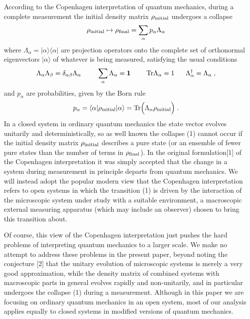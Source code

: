 \documentclass[12pt]{article}
\def\BM#1{\mbox{\boldmath{$#1$}}}
\begin{document}
According to the Copenhagen interpretation of quantum mechanics, during a complete measurement the initial density matrix $\rho_{\rm initial}$ undergoes a collapse 
\begin{equation}
\rho_{\rm initial}\mapsto \rho_{\rm final}=\sum_\alpha p_\alpha\Lambda_\alpha
\end{equation}
where $\Lambda_\alpha=|\alpha\rangle\langle\alpha|$ are projection operators onto the complete set of orthonormal eigenvectors $|\alpha\rangle$  of whatever is being measured, satisfying the usual conditions
\begin{equation}
\Lambda_\alpha\Lambda_\beta=\delta_{\alpha\beta}\Lambda_\alpha~~~~~~~\sum_\alpha\Lambda_\alpha=\BM{1}~~~~~~~{\rm Tr}\Lambda_\alpha=1~~~~~\Lambda_\alpha^\dagger=\Lambda_\alpha\;,
\end{equation}
and $p_\alpha$ are probabilities, given by the Born rule 
\begin{equation}
p_\alpha=\langle\alpha|\rho_{\rm initial}|\alpha\rangle={\rm Tr}\Big(\Lambda_\alpha \rho_{\rm initial}\Big)\;.
\end{equation}
In a closed system in ordinary quantum mechanics the state vector evolves unitarily and deterministically, so as well known the collapse (1) cannot occur if the initial density matrix $\rho_{\rm initial}$ describes a pure state (or an ensemble of fewer pure states than the number of terms in $\rho_{\rm final}$).  In the original formulation[1] of the Copenhagen interpretation it was simply accepted that the change in a system during measurement in principle  departs from quantum mechanics.  We will instead adopt the popular modern  view that  the Copenhagen interpretation refers to open systems in which the transition (1) is driven by the interaction of the microscopic system under study with a suitable environment, a macroscopic external measuring apparatus (which may include an observer) chosen to bring this transition about.

Of course, this view of the Copenhagen interpretation just pushes  the hard problems of interpreting quantum mechanics to a  larger scale.  We make no attempt to address these problems in the present paper, beyond noting the conjecture [2] that  the unitary evolution of microscopic systems is merely a very good approximation, while the density matrix of combined systems with macroscopic parts in general evolves rapidly  and non-unitarily, and in particular undergoes the collapse (1) during a measurement.   Although in this paper we are focusing on 
ordinary quantum mechanics in an open system,  most of our analysis applies equally to closed systems in modified versions of quantum mechanics.
\end{document}
